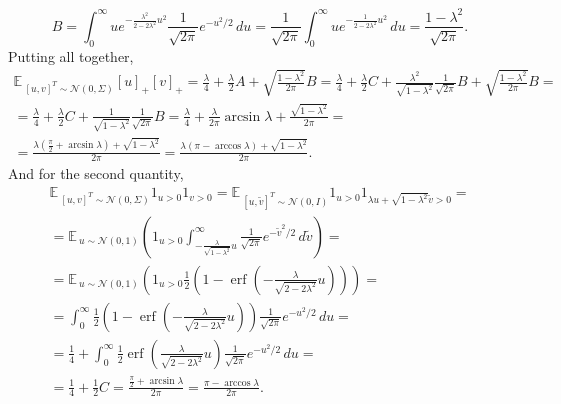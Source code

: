 \documentclass{article}
\newcommand{\EE}{\mathbb{E}\,}
\newcommand{\NN}{\mathcal{N}}
\DeclareMathOperator*{\erf}{erf}
\begin{document}
    \begin{equation}
        B
        = \int_0^\infty u e^{-\frac{\lambda^2}{2-2\lambda^2} u^2} \frac{1}{\sqrt{2\pi}} e^{-u^2/2} \, du
        =  \frac{1}{\sqrt{2\pi}}\int_0^\infty u e^{-\frac{1}{2-2\lambda^2} u^2} \, du
        = \frac{1-\lambda^2}{\sqrt{2\pi}}.
    \end{equation}
    Putting all together,
    \begin{multline}
        \EE_{[u,v]^T \sim \NN(0,\Sigma)} [u]_+ [v]_+
        = \frac{\lambda}{4} + \frac{\lambda}{2} A + \sqrt{\frac{1-\lambda^2}{2\pi}} B
        = \frac{\lambda}{4} + \frac{\lambda}{2} C + \frac{\lambda^2}{\sqrt{1-\lambda^2}} \frac{1}{\sqrt{2\pi}} B + \sqrt{\frac{1-\lambda^2}{2\pi}} B
        =\\= \frac{\lambda}{4} + \frac{\lambda}{2} C + \frac{1}{\sqrt{1-\lambda^2}} \frac{1}{\sqrt{2\pi}} B
        = \frac{\lambda}{4} + \frac{\lambda}{2\pi} \arcsin\lambda + \frac{\sqrt{1-\lambda^2}}{2\pi}
        =\\= \frac{\lambda\left(\frac{\pi}{2} + \arcsin\lambda\right) + \sqrt{1-\lambda^2}}{2\pi}
        = \frac{\lambda\left(\pi - \arccos\lambda\right) + \sqrt{1-\lambda^2}}{2\pi}.
    \end{multline}
    And for the second quantity,
    \begin{multline}
        \EE_{[u,v]^T \sim \NN(0,\Sigma)} 1_{u>0} 1_{v>0}
        = \EE_{[u,\tilde v]^T \sim \NN(0,I)} 1_{u>0} 1_{\lambda u + \sqrt{1-\lambda^2} \tilde v > 0}
        =\\= \EE_{u \sim \NN(0,1)} \left(1_{u>0} \int_{-\frac{\lambda}{\sqrt{1-\lambda^2}} u}^\infty \frac{1}{\sqrt{2\pi}} e^{-\tilde v^2/2} \, d\tilde v \right)
        =\\= \EE_{u \sim \NN(0,1)} \left(
            1_{u>0} \frac{1}{2} \left(1 - \erf\left(-\frac{\lambda}{\sqrt{2-2\lambda^2}} u\right)\right)
        \right)
        =\\= \int_0^\infty \frac{1}{2} \left(1 - \erf\left(-\frac{\lambda}{\sqrt{2-2\lambda^2}} u\right)\right) \frac{1}{\sqrt{2\pi}} e^{-u^2/2} \, du
        =\\= \frac{1}{4} + \int_0^\infty \frac{1}{2} \erf\left(\frac{\lambda}{\sqrt{2-2\lambda^2}} u\right) \frac{1}{\sqrt{2\pi}} e^{-u^2/2} \, du
        =\\= \frac{1}{4} + \frac{1}{2} C
        = \frac{\frac{\pi}{2} + \arcsin\lambda}{2\pi}
        = \frac{\pi - \arccos\lambda}{2\pi}.
    \end{multline}
\end{document}
